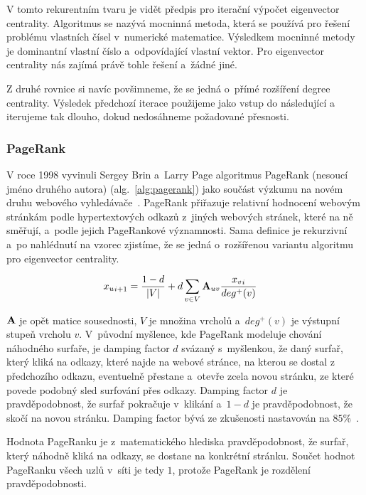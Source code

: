 \documentclass{bakalarka}
\begin{document}
V tomto rekurentním tvaru je vidět předpis pro iterační výpočet eigenvector
centrality. Algoritmus se nazývá mocninná metoda, která se používá pro řešení
problému vlastních čísel v~numerické matematice. Výsledkem mocninné metody je
dominantní vlastní číslo a~odpovídající vlastní vektor. Pro eigenvector
centrality nás zajímá právě tohle řešení a~žádné jiné.

Z druhé rovnice si navíc povšimneme, že se jedná o~přímé rozšíření degree
centrality. Výsledek předchozí iterace použijeme jako vstup do následující a
iterujeme tak dlouho, dokud nedosáhneme požadované přesnosti.

\subsubsection{PageRank}
V roce 1998 vyvinuli Sergey Brin a~Larry Page algoritmus PageRank (nesoucí
jméno druhého autora) (alg.~\ref{alg:pagerank}) jako součást výzkumu na novém
druhu webového vyhledávače~\citep{pagerankoriginal,visemalseed2005,page1997}.
PageRank přiřazuje relativní hodnocení webovým stránkám podle hypertextových
odkazů z~jiných webových stránek, které na ně směřují, a~podle jejich
PageRankové významnosti. Sama definice je rekurzivní a~po nahlédnutí na vzorec
zjistíme, že se jedná o~rozšířenou variantu algoritmu pro eigenvector
centrality.

\begin{align*}
{x_u}_{i + 1} &= \frac{1 - d}{|V|} + d \displaystyle\sum_{v \in V} {\bf A}_{uv}
\frac{{x_v}_{i}}{deg^+ (v)}
\end{align*}

${\bf A}$ je opět matice sousednosti, $V$ je množina vrcholů a~$deg^+(v)$ je
výstupní stupeň vrcholu $v$. V~původní myšlence, kde PageRank modeluje chování
náhodného surfaře, je damping factor $d$ svázaný s~myšlenkou, že daný surfař,
který kliká na odkazy, které najde na webové stránce, na kterou se dostal z
předchozího odkazu, eventuelně přestane a~otevře zcela novou stránku, ze které
povede podobný sled surfování přes odkazy. Damping factor $d$ je
pravděpodobnost, že surfař pokračuje v~klikání a~$1 - d$ je pravděpodobnost, že
skočí na novou stránku. Damping factor bývá ze zkušenosti nastavován na
$85\%$~\citep{pagerankoriginal}.

Hodnota PageRanku je z~matematického hlediska pravděpodobnost, že surfař, který
náhodně kliká na odkazy, se dostane na konkrétní stránku. Součet hodnot
PageRanku všech uzlů v~síti je tedy $1$, protože PageRank je rozdělení
pravděpodobnosti.
\end{document}
